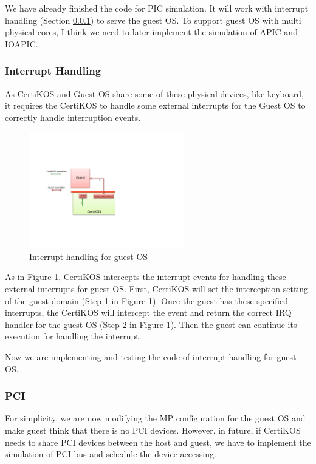 \documentclass[a4paper,12pt]{article}
\begin{document}
We have already finished the code for PIC simulation.  It will work with interrupt handling (Section \ref{subsec:interrupthandling}) to serve the guest OS.
To support guest OS with multi physical cores, I think we need to later implement the simulation of APIC and IOAPIC.

\subsubsection{Interrupt Handling}
\label{subsec:interrupthandling}
As CertiKOS and Guest OS share some of these physical devices, like keyboard, it requires the CertiKOS to handle some external interrupts for the Guest OS to correctly handle interruption events.

  \begin{figure}[!ht]
 \centerline{
 \includegraphics[width=0.6\textwidth]{interrupt_handle}}
 \caption{Interrupt handling for guest OS} \label{fig:interrupthandle}
\end{figure}
As in Figure \ref{fig:interrupthandle}, CertiKOS intercepts the interrupt events for handling these external interrupts for guest OS.   First, CertiKOS will set the interception setting of the guest domain (Step 1 in Figure \ref{fig:interrupthandle}).  Once the guest has these specified interrupts, the CertiKOS will intercept the event and return the correct IRQ handler for the guest OS (Step 2 in Figure \ref{fig:interrupthandle}). Then the guest can continue its execution for handling the interrupt.

Now we are implementing and testing  the code of interrupt handling for guest OS.

\subsubsection{PCI}
For simplicity, we are now modifying the MP configuration for the guest OS and make guest think that there is no PCI devices.
However, in future, if CertiKOS needs to share PCI devices between the host and guest, we have to implement the simulation of PCI bus and schedule the device accessing.
\end{document}
